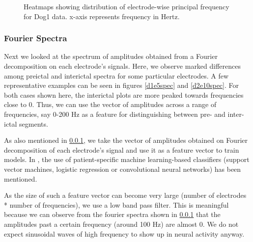 \documentclass[a4paper]{article}
\begin{document}
\begin{figure}[H]
	\centering
	\qquad
	\caption{Heatmaps showing distribution of electrode-wise principal frequency for Dog1 data. x-axis represents frequency in Hertz.}
	\label{d1freq}
\end{figure}

\subsubsection{Fourier Spectra}
\label{spec}
Next we looked at the spectrum of amplitudes obtained from a Fourier decomposition on each electrode's signals. Here, we observe marked differences among preictal and interictal spectra for some particular electrodes. A few representative examples can be seen in figures \ref{d1e5spec} and \ref{d2e10spec}. For both cases shown here, the interictal plots are more peaked towards frequencies close to 0. Thus, we can use the vector of amplitudes across a range of frequencies, say 0-200 Hz as a feature for distinguishing between pre- and inter-ictal segments. 

As also mentioned in \ref{spec}, we take the vector of amplitudes obtained on Fourier decomposition of each electrode's signal and use it as a feature vector to train models. In \cite{lecun}, the use of patient-specific machine learning-based classifiers (support vector machines, logistic regression or convolutional neural networks) has been mentioned. 

As the size of such a feature vector can become very large (number of electrodes * number of frequencies), we use a low band pass filter. This is meaningful because we can observe from the fourier spectra shown in \ref{spec} that the amplitudes past a certain frequency (around 100 Hz) are almost 0. We do not expect sinusoidal waves of high frequency to show up in neural activity anyway.
\end{document}
